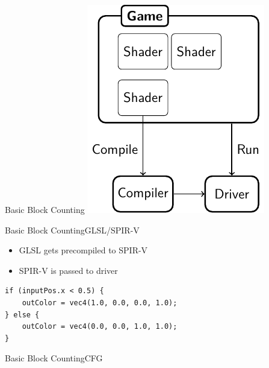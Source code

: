 \documentclass[xcolor={usenames,dvipsnames}, aspectratio=169, 12pt]{beamer}
\begin{document}
\begin{frame}{Basic Block Counting}
	\centering
	\includegraphics{figures/bb-count-overview-figure0.pdf}
\end{frame}

\begin{frame}[fragile]{Basic Block Counting}{GLSL/SPIR-V}
\begin{itemize}
	\item GLSL gets precompiled to SPIR-V
	\item SPIR-V is passed to driver
\end{itemize}

\begin{lstlisting}
if (inputPos.x < 0.5) {
	outColor = vec4(1.0, 0.0, 0.0, 1.0);
} else {
	outColor = vec4(0.0, 0.0, 1.0, 1.0);
}
\end{lstlisting}
\end{frame}
\framelogo{}

{
\begin{frame}{Basic Block Counting}{CFG}
	\centering
	
\end{frame}}
\end{document}
